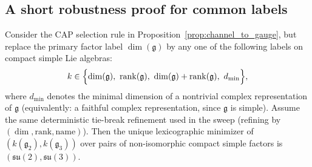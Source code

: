 \subsection{A short robustness proof for common labels}
\label{subsec:gauge_label_robustness_proof}
\begin{proposition}
\label{prop:gauge_label_robustness}
Consider the CAP selection rule in Proposition~\ref{prop:channel_to_gauge}, but replace the primary factor label $\dim(\mathfrak{g})$ by any one of the following labels on compact simple Lie algebras:
\[
k\in\Bigl\{\dim(\mathfrak{g}),\ \mathrm{rank}(\mathfrak{g}),\ \dim(\mathfrak{g})+\mathrm{rank}(\mathfrak{g}),\ d_{\min}\Bigr\},
\]
where $d_{\min}$ denotes the minimal dimension of a nontrivial complex representation of $\mathfrak{g}$ (equivalently: a faithful complex representation, since $\mathfrak{g}$ is simple).
Assume the same deterministic tie-break refinement used in the sweep (refining by $(\dim,\mathrm{rank},\text{name})$).
Then the unique lexicographic minimizer of $(k(\mathfrak{g}_2),k(\mathfrak{g}_3))$ over pairs of non-isomorphic compact simple factors is
$(\mathfrak{su}(2),\mathfrak{su}(3))$.
\end{proposition}
